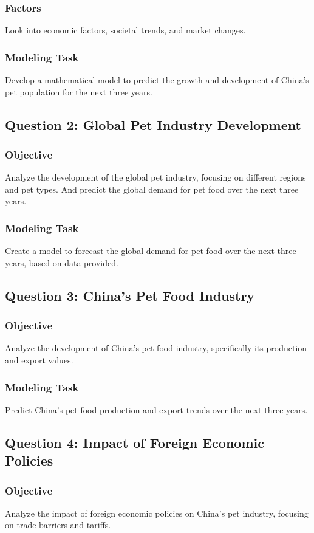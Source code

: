 \documentclass[withoutpreface,bwprint]{cumcmthesis} %
\begin{document}
\subsubsection{Factors}
Look into economic factors, societal trends, and market changes.
\subsubsection{Modeling Task}
Develop a mathematical model to predict the growth and development of China's pet population for the next three years.
\subsection{Question 2: Global Pet Industry Development}
\subsubsection{Objective}
Analyze the development of the global pet industry, focusing on different regions and pet types.
And predict the global demand for pet food over the next three years.
\subsubsection{Modeling Task}
Create a model to forecast the global demand for pet food over the next three years, based on data provided.
\subsection{Question 3: China's Pet Food Industry}
\subsubsection{Objective}
Analyze the development of China's pet food industry, specifically its production and export values.
\subsubsection{Modeling Task}
Predict China's pet food production and export trends over the next three years.
\subsection{Question 4: Impact of Foreign Economic Policies}
\subsubsection{Objective}
Analyze the impact of foreign economic policies on China's pet industry, focusing on trade barriers and tariffs.
\end{document}
